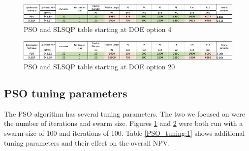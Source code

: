 \documentclass[balance,upint,subscriptcorrection,varvw,mathalfa=cal=boondoxo,spanish,french,vietnamese,russian,greek,pdf-a,colorlinks]{asmeconf}
\begin{document}


\begin{figure}[btp]
\centering\includegraphics[width=0.7\linewidth]{images/optimization_point_4.jpg}
\caption{PSO and SLSQP table starting at DOE option 4}\label{optimization_4:1}
\end{figure}
 



\begin{figure}[btp]
\centering\includegraphics[width=0.7\linewidth]{images/optimization_point_20.jpg}
\caption{PSO and SLSQP table starting at DOE option 20}\label{optimization_20:1}
\end{figure}


\subsection*{PSO tuning parameters}
The PSO algorithm has several tuning parameters. The two we focused on were the number of iterations and swarm size. Figures \ref{optimization_4:1} and \ref{optimization_20:1} were both run with a swarm size of 100 and iterations of 100. Table \ref{PSO_tuning:1} shows additional tuning parameters and their effect on the overall NPV. 

\begin{table}[btp]
\caption[Table]{PSO Tuning}\label{PSO_tuning:1}
\end{table}
\end{document}
